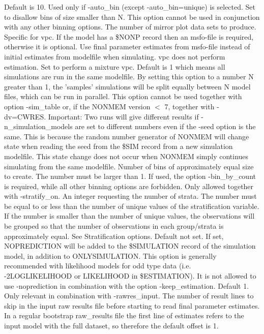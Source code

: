 \begin{optionlist}
\nextopt
{}
Default is 10. Used only if -auto\_bin (except -auto\_bin=unique) is selected. Set to disallow bins of size smaller than N. 
This option cannot be used in conjunction with any other binning options.
\nextopt
{}
The number of mirror plot data sets to produce. Specific for vpc. 
\nextopt
{}
If the model has a \$NONP record then an msfo-file is required, otherwise it is optional. Use final parameter estimates from msfo-file instead of initial estimates from modelfile when simulating. vpc does not perform estimation. 
\nextopt
{}
Set to perform a mixture vpc.
\nextopt
{}
Default is 1 which means all simulations are run in the same modelfile. By setting this option to a number N greater than 1, the 'samples' simulations will be split equally between N model files, which can be run in parallel. This option cannot be used together with option \mbox{-sim\_table} or, if the NONMEM version $<$ 7, together with -dv=CWRES. Important: Two runs will give different results if -n\_simulation\_models are set to different numbers even if the -seed option is the same. This is because the random number generator of NONMEM will change state when reading the seed from the \$SIM record from a new simulation modelfile. This state change does not occur when NONMEM simply continues simulating from the same modelfile. 
\nextopt
{}
Number of bins of approximately equal size to create. The number must be larger than 1. If used, the option -bin\_by\_count is required, while all other binning options are forbidden.
Only allowed together with -stratify\_on. An integer requesting the number of strata. The number must be equal to or less than the number of unique values of the stratification variable. If the number is smaller than the number of unique values, the observations will be grouped so that the number of observations in each group/strata is approximately equal. See Stratification options.  
\nextopt
{}
Default not set. If set, NOPREDICTION will be added to the \$SIMULATION record of the simulation model, in addition to ONLYSIMULATION. This option is generally recommended with likelihood models for odd type data (i.e. -2LOGLIKELIHOOD or LIKELIHOOD in \$ESTIMATION). It is not allowed to use -noprediction in combination with the option \mbox{-keep\_estimation}. 
\nextopt
{}
Default 1. Only relevant in combination with -rawres\_input. The number of result lines to skip in the input raw results file before starting to read final parameter estimates. In a regular bootstrap raw\_results file the first line of estimates refers to the input model with the full dataset, so therefore the default offset is 1. 

\end{optionlist}
